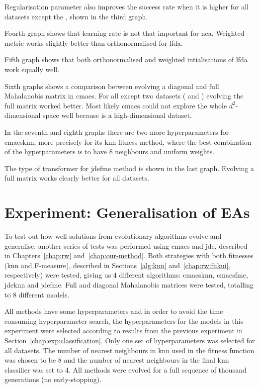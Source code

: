 \documentclass[12pt,a4paper]{report}
\begin{document}
Regularisation parameter also improves the success rate when it is higher for all datasets except the , shown in the third graph.

Fourth graph shows that learning rate is not that important for \ac{nca}. Weighted metric works slightly better than orthonormalised for \ac{lfda}.

Fifth graph shows that both orthonormalised and weighted intialisations of \ac{lfda} work equally well.

Sixth graphs shows a comparison between evolving a diagonal and full Mahalanobis matrix in \ac{cmaes}. For all except two datasets ( and ) evolving the full matrix worked better. Most likely \ac{cmaes} could not explore the whole $d^2$-dimensional space well because  is a high-dimensional dataset.

In the seventh and eighth graphs there are two more hyperparameters for \ac{cmaesknn}, more precisely for its \ac{knn} fitness method, where the best combination of the hyperparameters is to have 8 neighbours and uniform weights.

The type of transformer for \ac{jdefme} method is shown in the last graph. Evolving a full matrix works clearly better for all datasets.


\section{Experiment: Generalisation of EAs} \label{chap:exp:fitness}

To test out how well solutions from evolutionary algorithms evolve and generalise, another series of tests was performed using \ac{cmaes} and \ac{jde}, described in Chapters~\ref{chap:rw} and~\ref{chap:our-method}. Both strategies with both fitnesses (\ac{knn} and F-measure), described in Sections~\ref{alg:knn} and~\ref{chap:rw:fukui}, respectively) were tested, giving us 4 different algorithms: \ac{cmaesknn}, \ac{cmaesfme}, \ac{jdeknn} and \ac{jdefme}. Full and diagonal Mahalanobis matrices were tested, totalling to 8 different models.

All methods have some hyperparameters and in order to avoid the time consuming hyperparameter search, the hyperparameters for the models in this experiment were selected according to results from the previous experiment in Section~\ref{chap:exp:classification}. Only one set of hyperparameters was selected for all datasets. The number of nearest neighbours in \ac{knn} used in the fitness function was chosen to be 8 and the number of nearest neighbours in the final \ac{knn} classifier was set to 4. All methods were evolved for a full sequence of thousand generations (no early-stopping).
\end{document}
